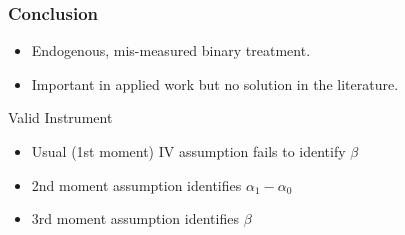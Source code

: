 \documentclass{beamer}
\begin{document}
\begin{frame}
  \frametitle{Conclusion}
  \singlespacing
  \small
  \begin{itemize}
    \item Endogenous, mis-measured binary treatment.
    \item Important in applied work but no solution in the literature.
  \end{itemize}
  \begin{block}{Valid Instrument}
    \begin{itemize}
      \item Usual (1st moment) IV assumption fails to identify $\beta$
      \item 2nd moment assumption identifies $\alpha_1 - \alpha_0$
      \item 3rd moment assumption identifies $\beta$ 
    \end{itemize}
  \end{block}
\end{frame}
\end{document}
